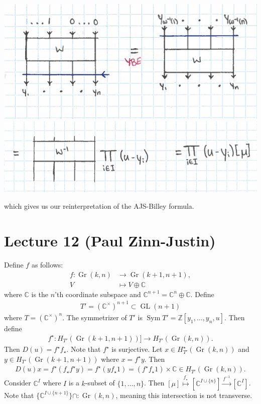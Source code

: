 \documentclass[12pt]{amsart}
\numberwithin{equation}{section}
\theoremstyle{definition}
\numberwithin{figure}{section}
\newcommand{\C}{\mathbb{C}}
\newcommand{\Z}{\mathbb{Z}}
\newcommand{\GL}{\operatorname{GL}}
\newcommand{\Sym}{\operatorname{Sym}}
\newcommand{\on}[1]{\operatorname{#1}}
\newcommand{\Gr}{\on{Gr}}
\begin{document}
\begin{center}
	\includegraphics[]{lecture_diagrams_cropped_5.png} \\
	\includegraphics[]{lecture_diagrams_cropped_6.png}
\end{center}
which gives us our reinterpretation of the AJS-Billey formula.

\section{Lecture 12 (Paul Zinn-Justin)}
    Define $f$ as follows:
\begin{align*}
    f:\Gr(k,n)&\to\Gr(k+1,n+1), \\
    V&\mapsto V\oplus\C
\end{align*}
where $\C$ is the $n$'th coordinate subspace and $\C^{n+1}=\C^n\oplus\C$.
Define
\begin{align*}
    T'=(\C^\times)^{n+1}\subset\GL(n+1)
\end{align*}
where $T=(\C^\times)^n$. The symmetrizer of $T'$ is $\Sym T'=\Z[y_1,\ldots,y_n,u]$. Then define
\begin{align*}
    f^\star:H_{T'}(\Gr(k+1,n+1))]\to H_{T'}(\Gr(k,n)).
\end{align*}
Then $D(u)=f^\star f_\star$. Note that $f^\star$ is surjective. Let $x\in H_{T'}^\star(\Gr(k,n))$ and $y\in H_{T'}(\Gr(k+1,n+1))$ where $x=f^\star y$. Then
\begin{align*}
    D(u)x = f^\star(f_\star f^\star y) = f^\star(yf_\star 1) = (f^\star f_\star 1)\times\C\in H_{T'}(\Gr(k,n)).
\end{align*}
Consider $\C^I$ where $I$ is a $k$-subset of $\{1,\ldots,n\}$. Then $[\mu]\stackrel{f_\star}{\mapsto}[\C^{I\cup\{n\}}]\stackrel{f^{-1}}{\to}[\C^I]$. Note that $\{\C^{I\cup\{n+1\}}\}\cap:\Gr(k,n)$, meaning this intersection is not transverse.
\end{document}
